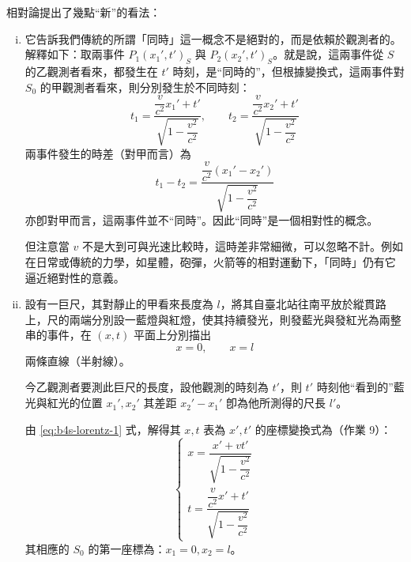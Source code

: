 相對論提出了幾點“新”的看法：
\begin{enumerate}[(i)]
  \item 它告訴我們傳統的所謂「同時」這一概念不是絕對的，而是依賴於觀測者的。解釋如下：取兩事件 $P_1(x_1', t')_S$ 與 $P_2(x_2', t')_S$。就是說，這兩事件從 $S$ 的乙觀測者看來，都發生在 $t'$ 時刻，是“同時的”，但根據變換式，這兩事件對 $S_0$ 的甲觀測者看來，則分別發生於不同時刻：
  \[ t_1 = \frac{\dfrac{v}{c^2}x_1' + t'}{\sqrt{1 - \dfrac{v^2}{c^2}}}, \qquad t_2 = \frac{\dfrac{v}{c^2}x_2' + t'}{\sqrt{1 - \dfrac{v^2}{c^2}}} \]
  兩事件發生的時差（對甲而言）為
  \[ t_1 - t_2 = \frac{\dfrac{v}{c^2}(x_1' - x_2')}{\sqrt{1 - \dfrac{v^2}{c^2}}} \]
  亦卽對甲而言，這兩事件並不“同時”。因此“同時”是一個相對性的概念。

  但注意當 $v$ 不是大到可與光速比較時，這時差非常細微，可以忽略不計。例如在日常或傳統的力學，如星體，砲彈，火箭等的相對運動下，「同時」仍有它逼近絕對性的意義。

  \item 設有一巨尺，其對靜止的甲看來長度為 $l$，將其自臺北站往南平放於縱貫路上，尺的兩端分別設一藍燈與紅燈，使其持續發光，則發藍光與發紅光為兩整串的事件，在 $(x, t)$ 平面上分別描出
  \[ x = 0, \qquad x = l \]
  兩條直線（半射線）。

  今乙觀測者要測此巨尺的長度，設他觀測的時刻為 $t'$，則 $t'$ 時刻他“看到的”藍光與紅光的位置 $x_1', x_2'$ 其差距 $x_2' - x_1'$ 卽為他所測得的尺長 $l'$。

  由 \eqref{eq:b4s-lorentz-1} 式，解得其 $x, t$ 表為 $x', t'$ 的座標變換式為（作業 9）：
  \begin{equation}
  \begin{cases}
  x = \dfrac{x' + vt'}{\sqrt{1 - \dfrac{v^2}{c^2}}} \\[1.5em]
  t = \dfrac{\dfrac{v}{c^2}x' + t'}{\sqrt{1 - \dfrac{v^2}{c^2}}}
  \end{cases} \label{eq:b4s-lorentz-2}
  \end{equation}
  其相應的 $S_0$ 的第一座標為：$x_1 = 0, x_2 = l$。

  \begin{figure}[H]
  \centering
\end{figure}
\end{enumerate}
